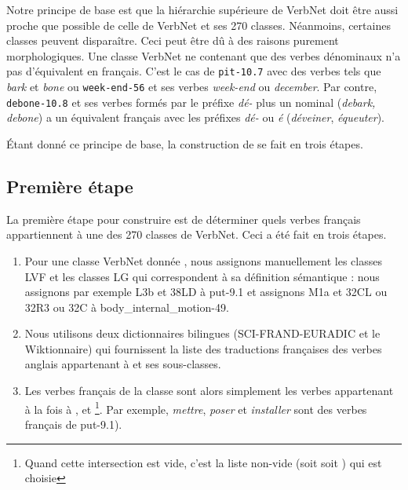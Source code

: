 Notre principe de base est que la hiérarchie supérieure de VerbNet doit être
aussi proche que possible de celle de VerbNet et ses 270 classes. Néanmoins,
certaines classes peuvent disparaître. Ceci peut être dû à des raisons purement
morphologiques. Une classe VerbNet ne contenant que des verbes dénominaux n'a
pas d'équivalent en français. C'est le cas de \texttt{pit-10.7} avec des verbes
tels que \emph{bark} et \emph{bone} ou \texttt{week-end-56} et ses verbes
\emph{week-end} ou \emph{december}. Par contre, \texttt{debone-10.8} et ses
verbes formés par le préfixe \emph{dé-} plus un nominal (\emph{debark, debone})
a un équivalent français avec les préfixes \emph{dé-} ou \emph{é}
(\emph{déveiner}, \emph{équeuter}).

Étant donné ce principe de base, la construction de \verbenet{} se fait en
trois étapes.

\subsection{Première étape}\label{first}

La première étape pour construire \verbenet{} est de déterminer quels verbes
français appartiennent à une des 270 classes de VerbNet. Ceci a été fait en
trois étapes.

\begin{enumerate}

    \item Pour une classe VerbNet donnée \Ce{}, nous assignons manuellement les
        classes LVF \Clvf{} et les classes LG \Clg{} qui correspondent à sa
        définition sémantique : nous assignons par exemple {\color{red}L3b} et
        {\color{green}38LD} à {\color{blue}put-9.1} et assignons
        {\color{red}M1a} et {\color{green}32CL ou 32R3 ou 32C} à
        {\color{blue}body\_internal\_motion-49}.

    \item Nous utilisons deux dictionnaires bilingues (SCI-FRAND-EURADIC et le
        Wiktionnaire) qui fournissent la liste \Ltrad{} des traductions
        françaises des verbes anglais appartenant à \Ce{} et ses sous-classes.

    \item Les verbes français de la classe \Ce{} sont alors simplement les
        verbes appartenant à la fois à \Ltrad{}, \Clvf{} et
        \Clg{}\footnote{Quand cette intersection est vide, c'est la liste
        non-vide (soit \Clvf{} soit \Clg{}) qui est choisie}. Par exemple,
        \emph{mettre}, \emph{poser} et \emph{installer} sont des verbes
        français de {\color{blue}put-9.1}).

\end{enumerate}

